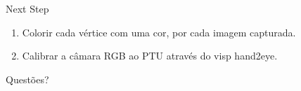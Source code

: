 \begin{frame}{Next Step}
    
    \begin{enumerate}
        \item Colorir cada vértice com uma cor, por cada imagem capturada.
        \item Calibrar a câmara RGB ao PTU através do visp hand2eye.
    \end{enumerate}

\end{frame}

\begin{frame}[standout]
    
    Questões?

\end{frame}